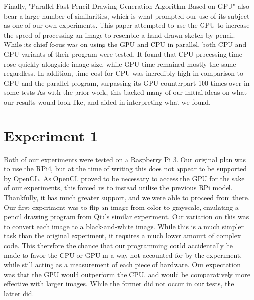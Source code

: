 \documentclass[conference]{IEEEtran}
\begin{document}
Finally, "Parallel Fast Pencil Drawing Generation Algorithm Based on GPU" also bear a large number of similarities, which is what prompted our use of its subject as one of our own experiments. This paper attempted to use the GPU to increase the speed of processing an image to resemble a hand-drawn sketch by pencil. While its chief focus was on using the GPU and CPU in parallel, both CPU and GPU variants of their program were tested. It found that CPU processing time rose quickly alongside image size, while GPU time remained mostly the same regardless. In addition, time-cost for CPU was incredibly high in comparison to GPU and the parallel program, surpassing its GPU counterpart 100 times over in some tests As with the prior work, this backed many of our initial ideas on what our results would look like, and aided in interpreting what we found.

\section{Experiment 1}
Both of our experiments were tested on a Raspberry Pi 3. Our original plan was to use the RPi4, but at the time of writing this does not appear to be supported by OpenCL. As OpenCL proved to be necessary to access the GPU for the sake of our experiments, this forced us to instead utilize the previous RPi model. Thankfully, it has much greater support, and we were able to proceed from there.\\
Our first experiment was to flip an image from color to grayscale, emulating a pencil drawing program from Qiu's similar experiment. Our variation on this was to convert each image to a black-and-white image. While this is a much simpler task than the original experiment, it requires a much lower amount of complex code. This therefore the chance that our programming could accidentally be made to favor the CPU or GPU in a way not accounted for by the experiment, while still acting as a measurement of each piece of hardware. Our expectation was that the GPU would outperform the CPU, and would be comparatively more effective with larger images. While the former did not occur in our tests, the latter did.
\end{document}
